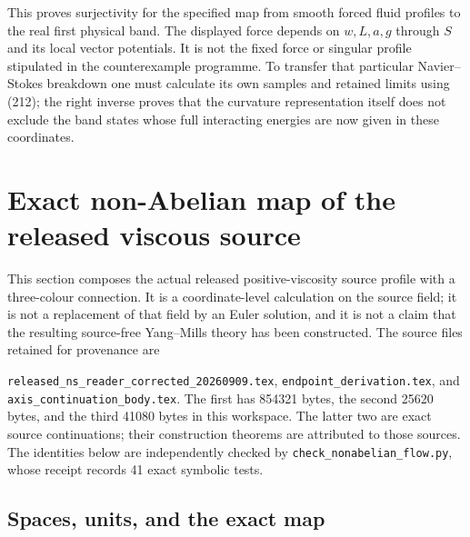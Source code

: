 \documentclass[11pt]{article}
\begin{document}
This proves surjectivity for the specified map from smooth forced
fluid profiles to the real first physical band. The displayed force
depends on $w,L,a,g$ through $S$ and its local vector potentials.
It is not the fixed force or singular profile stipulated in the
counterexample programme. To transfer that particular Navier--Stokes
breakdown one must calculate its own samples and retained limits
using (212); the right inverse proves that the
curvature representation itself does not exclude the band states
whose full interacting energies are now given in these coordinates.

\section{Exact non-Abelian map of the released viscous source}
\label{sec:nonabelian-fluid-profile}

This section composes the actual released positive-viscosity source
profile with a three-colour connection. It is a coordinate-level
calculation on the source field; it is not a replacement of that field by
an Euler solution, and it is not a claim that the resulting source-free
Yang--Mills theory has been constructed. The source files retained for
provenance are
\begin{sloppypar}
\texttt{released\_ns\allowbreak\_reader\allowbreak\_corrected\allowbreak\_20260909.tex},
\texttt{endpoint\_derivation.tex},
and
\texttt{axis\_continuation\_body.tex}.
The first has 854321 bytes, the second 25620 bytes, and the third 41080
bytes in this workspace. The latter two are exact source continuations;
their construction theorems are attributed to those sources. The
identities below are independently checked by
\texttt{check\_nonabelian\_flow.py}, whose receipt records 41 exact
symbolic tests.
\end{sloppypar}

\subsection{Spaces, units, and the exact map}
\end{document}

